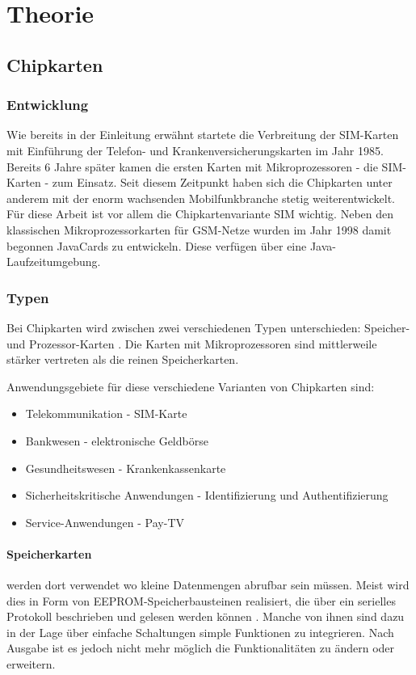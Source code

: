 \clearpage

\section{Theorie}
\label{theorie}

\subsection{Chipkarten}
\subsubsection{Entwicklung}
Wie bereits in der Einleitung erwähnt startete die Verbreitung der SIM-Karten
mit Einführung der Telefon- und Krankenversicherungskarten im Jahr 1985.
Bereits 6 Jahre später kamen die ersten Karten mit Mikroprozessoren - die \ac{SIM}-Karten
- zum Einsatz. Seit diesem Zeitpunkt haben sich die Chipkarten unter anderem
mit der enorm wachsenden Mobilfunkbranche stetig weiterentwickelt. Für diese
Arbeit ist vor allem die Chipkartenvariante \ac{SIM} wichtig.
Neben den klassischen Mikroprozessorkarten für \ac{GSM}-Netze wurden im Jahr
1998 damit begonnen JavaCards zu entwickeln. Diese verfügen über eine
Java-Laufzeitumgebung.

\subsubsection{Typen}
Bei Chipkarten wird zwischen zwei verschiedenen Typen unterschieden:
Speicher- und Prozessor-Karten \cite{chipkarten02}. Die Karten mit Mikroprozessoren
sind mittlerweile stärker vertreten als die reinen Speicherkarten.

Anwendungsgebiete für diese verschiedene Varianten von Chipkarten sind:
\begin{itemize}
\item Telekommunikation - \ac{SIM}-Karte
\item Bankwesen - elektronische Geldbörse
\item Gesundheitswesen - Krankenkassenkarte
\item Sicherheitskritische Anwendungen - Identifizierung und Authentifizierung
\item Service-Anwendungen - Pay-TV
\end{itemize}

\paragraph{Speicherkarten} werden dort verwendet wo kleine Datenmengen abrufbar
sein müssen. Meist wird dies in Form von \ac{EEPROM}-Speicherbausteinen realisiert,
die über ein serielles Protokoll beschrieben und gelesen werden können \cite{spitz11}.
Manche von ihnen sind dazu in der Lage über einfache Schaltungen simple Funktionen
zu integrieren. Nach Ausgabe ist es jedoch nicht mehr möglich die Funktionalitäten
zu ändern oder erweitern.

